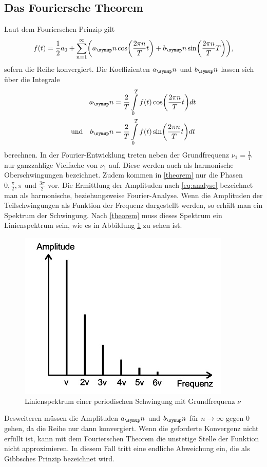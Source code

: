\subsection{Das Fouriersche Theorem}
Laut dem Fourierschen Prinzip gilt
\begin{equation}
  f(t)=\frac{1}{2}a_0+\sum_{n=1}^\infty\biggl(a_\su{n}\cos\biggl(\frac{2\pi n}{T}t\biggr)
  +b_\su{n}\sin\biggl(\frac{2\pi n}{T}T\biggr)\biggr)
  \label{theorem} ,
\end{equation}
sofern die Reihe konvergiert. Die Koeffizienten $a_\su{n}$ und $b_\su{n}$
lassen sich über die Integrale
\begin{equation}
 \begin{split}
  a_\su{n} &= \frac{2}{T}\int\limits_{0}^{T} f(t)\cos\biggl(\frac{2\pi n}{T}t\biggr)dt \\
  \text{und}\quad b_\su{n} &= \frac{2}{T}\int\limits_{0}^{T} f(t)\sin\biggl(\frac{2\pi n}
  {T}t\biggr)dt
  \label{eq:analyse}
 \end{split}
\end{equation}
berechnen. In der Fourier-Entwicklung treten neben der Grundfrequenz
$\nu_1=\frac{1}{T}$ nur ganzzahlige Vielfache von $\nu_1$ auf. Diese werden auch
als harmonische Oberschwingungen bezeichnet. Zudem kommen in \eqref{theorem} nur
die Phasen $0, \frac{\pi}{2}, \pi$ und $\frac{3\pi}{2}$ vor.
Die Ermittlung der Amplituden nach \eqref{eq:analyse} bezeichnet man als
harmonische, beziehungsweise Fourier-Analyse.
\newpage
Wenn die Amplituden der
Teilschwingungen als Funktion der Frequenz dargestellt werden, so erhält man ein
Spektrum der Schwingung. Nach \eqref{theorem} muss dieses Spektrum ein
Linienspektrum sein, wie es in Abbildung \ref{spektrum} zu sehen ist.
\begin{figure}[H]
  \centering
  \includegraphics{bilder/linienspektrum.jpg}
  \caption{Linienspektrum einer periodischen Schwingung mit Grundfrequenz $\nu$
  \cite{351}}
  \label{spektrum}
\end{figure}
Desweiteren müssen die Amplituden $a_\su{n}$ und $b_\su{n}$ für
$n\rightarrow\infty$ gegen 0 gehen, da die Reihe nur dann konvergiert.
Wenn die geforderte Konvergenz nicht erfüllt ist, kann mit dem Fourierschen
Theorem die unstetige Stelle der Funktion nicht approximieren. In diesem Fall
tritt eine endliche Abweichung ein, die als Gibbsches Prinzip bezeichnet wird.
